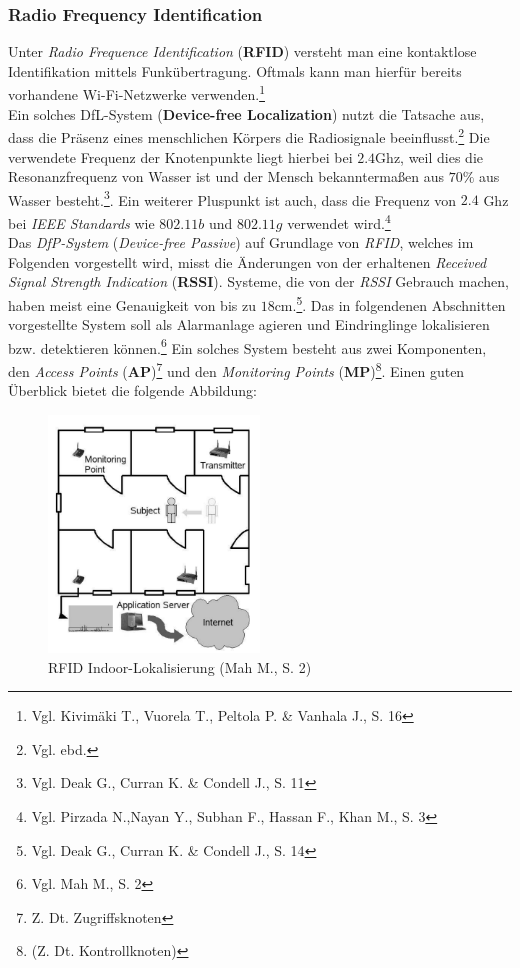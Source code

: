 \subsubsection{Radio Frequency Identification}
Unter \textit{Radio Frequence Identification} (\textbf{RFID}) versteht man eine kontaktlose Identifikation mittels Funkübertragung. Oftmals kann man hierfür bereits vorhandene Wi-Fi-Netzwerke verwenden.\footnote{Vgl. Kivimäki T., Vuorela T., Peltola P. \& Vanhala J., S.  16} \\
Ein solches DfL-System (\textbf{Device-free Localization}) nutzt die Tatsache aus, dass die Präsenz eines menschlichen Körpers die Radiosignale beeinflusst.\footnote{Vgl. ebd.} Die verwendete Frequenz der Knotenpunkte liegt hierbei bei $2.4$Ghz, weil dies die Resonanzfrequenz von Wasser ist und der Mensch bekanntermaßen aus $70\%$ aus Wasser besteht.\footnote{Vgl. Deak G.,  Curran K. \& Condell J., S. 11}. Ein weiterer Pluspunkt ist auch, dass die Frequenz von $2.4$ Ghz bei \textit{IEEE Standards} wie $802.11b$ und $802.11g$ verwendet wird.\footnote{Vgl. Pirzada N.,Nayan Y., Subhan F., Hassan F., Khan M., S. 3}\\
Das \textit{DfP-System} (\textit{Device-free Passive}) auf Grundlage von \textit{RFID}, welches im Folgenden vorgestellt wird, misst die Änderungen von der erhaltenen \textit{Received Signal Strength Indication} (\textbf{RSSI}). Systeme, die von der \textit{RSSI} Gebrauch machen, haben meist eine Genauigkeit von bis zu $18$cm.\footnote{Vgl. Deak G.,  Curran K. \& Condell J., S. 14}. Das in folgendenen Abschnitten vorgestellte System soll als Alarmanlage agieren und Eindringlinge lokalisieren bzw. detektieren können.\footnote{Vgl. Mah M., S. 2} Ein solches System besteht aus zwei Komponenten, den \textit{Access Points} (\textbf{AP})\footnote{Z. Dt. Zugriffsknoten} und den \textit{Monitoring Points} (\textbf{MP})\footnote{(Z. Dt. Kontrollknoten)}. Einen guten Überblick bietet die folgende Abbildung:\\

\begin{figure}[H]
	\centering
	\includegraphics[width=0.5\textwidth]{pictures/rfid}
	\caption{RFID Indoor-Lokalisierung (Mah M., S. 2)}
\end{figure}

